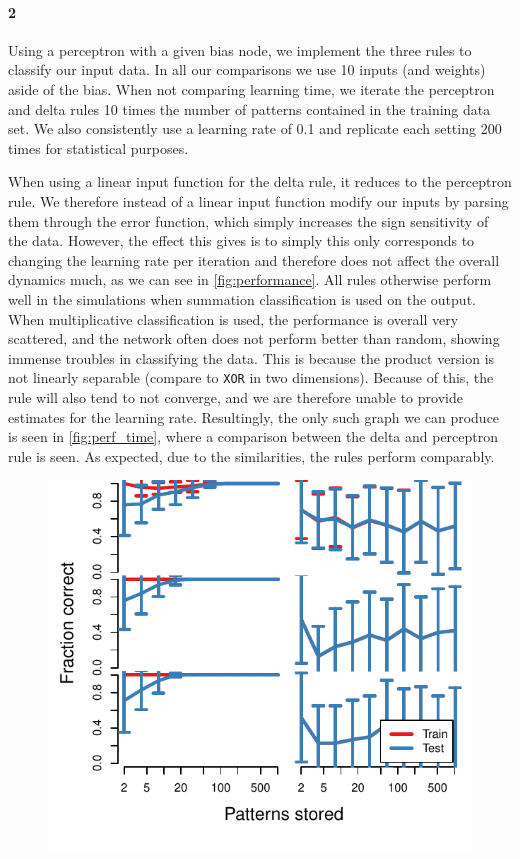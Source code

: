 \documentclass[10pt]{article}\usepackage[]{graphicx}\usepackage[]{color}
\makeatletter
\def\maxwidth{ %
  \ifdim\Gin@nat@width>\linewidth
    \linewidth
  \else
    \Gin@nat@width
  \fi
}
\theoremstyle{plain}
\makeatother
\begin{document}
\begin{multicols*}{2}
	\paragraph*{2}
	Using a perceptron with a given bias node, we implement the three rules to classify our input data. In all our comparisons we use 10 inputs (and weights) aside of the bias. When not comparing learning time, we iterate the perceptron and delta rules 10 times the number of patterns contained in the training data set. We also consistently use a learning rate of 0.1 and replicate each setting 200 times for statistical purposes. 
	
	When using a linear input function for the delta rule, it reduces to the perceptron rule. We therefore instead of a linear input function modify our inputs by parsing them through the error function, which simply increases the sign sensitivity of the data. However, the effect this gives is to simply this only corresponds to changing the learning rate per iteration and therefore does not affect the overall dynamics much, as we can see in \cref{fig:performance}. All rules otherwise perform well in the simulations when summation classification is used on the output. When multiplicative classification is used, the performance is overall very scattered, and the network often does not perform better than random, showing immense troubles in classifying the data. This is because the  product version is not linearly separable (compare to \texttt{XOR} in two dimensions). Because of this, the rule will also tend to not converge, and we are therefore unable to provide estimates for the learning rate. Resultingly, the only such graph we can produce is seen in \cref{fig:perf_time}, where a comparison between the delta and perceptron rule is seen. As expected, due to the similarities, the rules perform comparably.
	


\begin{Schunk}
\begin{figure}[H]

{\centering \includegraphics[width=\maxwidth]{../figures/twocolumn-performance-1} 

}
\end{figure}
\end{Schunk}
\end{multicols*}
\end{document}
